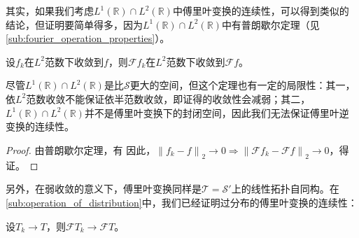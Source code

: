 其实，如果我们考虑$L^1(\mathbb{R})\cap L^2(\mathbb{R})$中傅里叶变换的连续性，可以得到类似的结论，但证明要简单得多，因为$L^1(\mathbb{R})\cap L^2(\mathbb{R})$中有普朗歇尔定理（见\ref{sub:fourier_operation_properties}）。
\begin{theorem}
    设$f_k$在$L^2$范数下收敛到$f$，则$\mathcal{F} f_k$在$L^2$范数下收敛到$\mathcal{F} f$。
\end{theorem}
\begin{remark}
    尽管$L^1(\mathbb{R})\cap L^2(\mathbb{R})$是比$\mathcal{S} $更大的空间，但这个定理也有一定的局限性：其一，依$L^2$范数收敛不能保证依半范数收敛，即证得的收敛性会减弱；其二，$L^1(\mathbb{R})\cap L^2(\mathbb{R})$并不是傅里叶变换下的封闭空间，因此我们无法保证傅里叶逆变换的连续性。
\end{remark}
\begin{proof}
    由普朗歇尔定理，有
    因此，$\left\|f_k-f\right\|_2\to 0\Rightarrow \left\|\mathcal{F} f_k-\mathcal{F} f\right\|_2\to 0$，得证。
\end{proof}

另外，在弱收敛的意义下，傅里叶变换同样是$\mathcal{T} =\mathcal{S} ' $上的线性拓扑自同构。在\ref{sub:operation_of_distribution}中，我们已经证明过分布的傅里叶变换的连续性：\begin{theorem}
    设$T_k\to T$，则$\mathcal{F} T_k\to \mathcal{F} T$。
\end{theorem}
